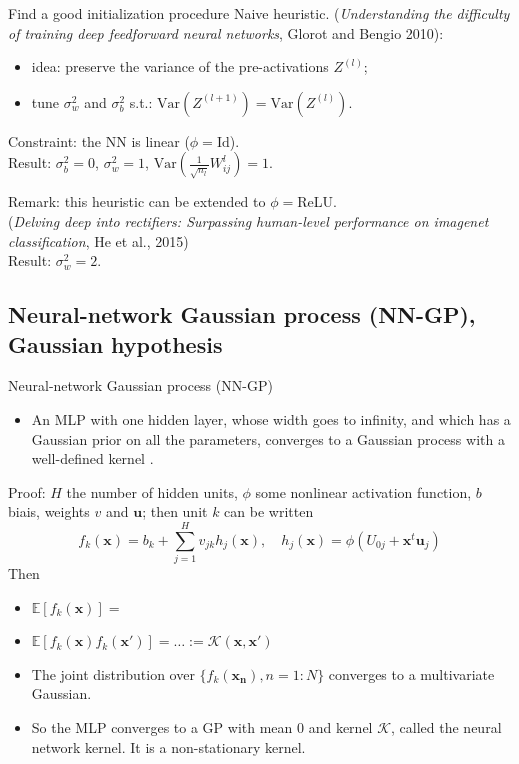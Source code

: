 \documentclass[9pt]{beamer}
\begin{document}
\begin{frame}{Find a good initialization procedure}
	\alert{Naive heuristic.} (\emph{Understanding the difficulty of training deep feedforward neural 
	networks}, Glorot and Bengio 2010):
	\begin{itemize}
		\item idea: preserve the variance of the pre-activations $Z^{(l)}$;
		\item tune $\sigma_w^2$ and $\sigma_b^2$ s.t.: $\mathrm{Var}(Z^{(l + 1)}) = 
		\mathrm{Var}(Z^{(l)})$. 
	\end{itemize}
	Constraint: the NN is linear ($\phi = \mathrm{Id}$).  \\
	Result: $\sigma_b^2 = 0$, $\sigma_w^2 = 1$, $\mathrm{Var}(\frac{1}{\sqrt{n_l}} W_{ij}^l) = 1$.

	
	\bigskip
	
	\alert{Remark:} this heuristic can be extended to $\phi = $ReLU. \\
	(\emph{Delving deep into rectifiers: Surpassing human-level performance on imagenet classification}, He et al.,  
	2015)  \\
	Result: $\sigma_w^2 = 2$.
\end{frame}

\subsection{Neural-network Gaussian process (NN-GP), Gaussian hypothesis}

\begin{frame}{Neural-network Gaussian process (NN-GP)}
	\begin{itemize}
		\item 	An MLP with one hidden layer, whose width goes to infinity, and which has a Gaussian prior on all the parameters, converges to a Gaussian process with a well-defined kernel \citep{neal1996bayesian}.
	\end{itemize}
	\alert{Proof}: $H$ the number of hidden units, $\phi$ some nonlinear activation function, $b$ biais, weights $v$ and $\boldsymbol{u}$; then unit $k$ can be written
		$$f_k(\boldsymbol{x}) = b_k+\sum_{j=1}^H v_{jk}h_j(\boldsymbol{x}), \quad h_j(\boldsymbol{x}) = \phi(U_{0j}+\boldsymbol{x}^t \boldsymbol{u}_j)$$
		Then
		\begin{itemize}
			\item $\mathbb{E}[f_k(\boldsymbol{x})]=$
			\item $\mathbb{E}[f_k(\boldsymbol{x})f_k(\boldsymbol{x}')]=\ldots := \mathcal{K}(\boldsymbol{x},\boldsymbol{x}')$
			\item The joint distribution over $\{f_k(\boldsymbol{x_n}), n=1:N\}$ converges to a multivariate Gaussian.
			\item So the MLP converges to a GP with mean 0 and kernel $\mathcal{K}$, called the \alert{neural network kernel}. It is a non-stationary kernel.
		\end{itemize}
\end{frame}
\end{document}
